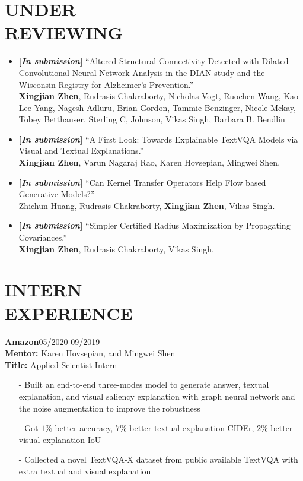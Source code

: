 \documentclass[margin]{res}
\begin{document}
\begin{resume}
\section{UNDER\\ REVIEWING}
				\begin{itemize}[noitemsep,wide=0pt,leftmargin=\dimexpr{} + 2\relax]\itemsep -0.0pt
				\item \textbf{[\emph{In submission}]} ``Altered Structural Connectivity Detected with Dilated Convolutional Neural Network Analysis in the DIAN study and the Wisconsin Registry for Alzheimer's Prevention.''\\
                            \textbf{Xingjian Zhen}, Rudrasis Chakraborty, Nicholas Vogt, Ruochen Wang, Kao Lee Yang, Nagesh Adluru, Brian Gordon, Tammie Benzinger, Nicole Mckay, Tobey Betthauser, Sterling C, Johnson, Vikas Singh, Barbara B. Bendlin
                \item \textbf{[\emph{In submission}]} ``A First Look: Towards Explainable TextVQA Models via Visual and Textual Explanations.''\\
                            \textbf{Xingjian Zhen}, Varun Nagaraj Rao, Karen Hovsepian, Mingwei Shen.
                \item \textbf{[\emph{In submission}]} ``Can Kernel Transfer Operators Help Flow based Generative Models?''\\
                            Zhichun Huang, Rudrasis Chakraborty, \textbf{Xingjian Zhen}, Vikas Singh.
                \item \textbf{[\emph{In submission}]} ``Simpler Certified Radius Maximization by Propagating Covariances.''\\
                            \textbf{Xingjian Zhen}, Rudrasis Chakraborty, Vikas Singh.
                \end{itemize}

\vspace{-1em}
\section{INTERN \\ EXPERIENCE}
                \textbf{Amazon}\hfill 05/2020-09/2019\\
                \textbf{Mentor:} Karen Hovsepian, and Mingwei Shen\\
                \textbf{Title:} Applied Scientist Intern
                \begin{itemize}\itemsep -2.2pt %
                \item[-] Built an end-to-end three-modes model to generate answer, textual explanation, and visual saliency explanation with graph neural network and the noise augmentation to improve the robustness
                \item[-] Got $1\%$ better accuracy, $7\%$ better textual explanation CIDEr, $2\%$ better visual explanation IoU
                 \item[-] Collected a novel TextVQA-X dataset from public available TextVQA with extra textual and visual explanation
                 \end{itemize}
                

\end{resume}
\end{document}
